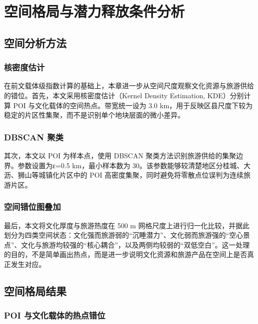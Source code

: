 \chapter{空间格局与潜力释放条件分析}\label{ux7a7aux95f4ux683cux5c40ux4e0eux6f5cux529bux91caux653eux6761ux4ef6ux5206ux6790}

\section{空间分析方法}\label{ux7a7aux95f4ux5206ux6790ux65b9ux6cd5}

\subsection{核密度估计}\label{ux6838ux5bc6ux5ea6ux4f30ux8ba1}

在前文载体级指数计算的基础上，本章进一步从空间尺度观察文化资源与旅游供给的错位。首先，本文采用核密度估计（Kernel Density Estimation, KDE）分别计算 POI 与文化载体的空间热点。带宽统一设为 3.0 km，用于反映区县尺度下较为稳定的片区性集聚，而不是识别单个地块层面的微小差异。

\subsection{DBSCAN 聚类}\label{dbscan-ux805aux7c7b}

其次，本文以 POI 为样本点，使用 DBSCAN 聚类方法识别旅游供给的集聚边界。参数设置为ε=0.5 km，最小样本数为 30。该参数能够较清楚地区分桂城、大沥、狮山等城镇化片区中的 POI 高密度集聚，同时避免将零散点位误判为连续旅游片区。

\subsection{空间错位图叠加}\label{ux7a7aux95f4ux9519ux4f4dux56feux53e0ux52a0}

最后，本文将文化厚度与旅游热度在 500 m 网格尺度上进行归一化比较，并据此划分为四类空间状态：文化强而旅游弱的``沉睡潜力''、文化弱而旅游强的``空心景点''、文化与旅游均较强的``核心耦合''，以及两侧均较弱的``双低空白''。这一处理的目的，不是简单画出热点，而是进一步说明文化资源和旅游产品在空间上是否真正发生对应。

\section{空间格局结果}\label{ux7a7aux95f4ux683cux5c40ux7ed3ux679c}

\subsection{POI 与文化载体的热点错位}\label{poi-ux4e0eux6587ux5316ux8f7dux4f53ux7684ux70edux70b9ux9519ux4f4d}


